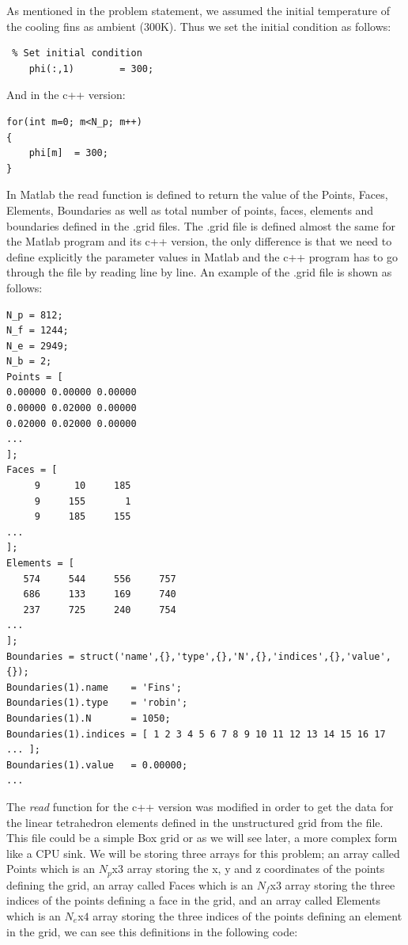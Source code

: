 \documentclass[12pt]{article}
\begin{document}
As mentioned in the problem statement, we assumed the initial temperature of the cooling fins as ambient (300K). Thus we set the initial condition as follows:

\begin{lstlisting}
 % Set initial condition
    phi(:,1)        = 300;
\end{lstlisting}

And in the c++ version:

\begin{lstlisting}[style=MyC++Style]
for(int m=0; m<N_p; m++)
{
	phi[m]	= 300;
}
\end{lstlisting}

In Matlab the read function is defined to return the value of the Points, Faces, Elements, Boundaries as well as total number of points, faces, elements and boundaries defined in the .grid files.
The .grid file is defined almost the same for the Matlab program and its c++ version, the only difference is that we need to define explicitly the parameter values in Matlab and the c++ 
program has to go through the file by reading line by line. An example of the .grid file is shown as follows:

\begin{lstlisting}
N_p = 812;
N_f = 1244;
N_e = 2949;
N_b = 2;
Points = [
0.00000	0.00000	0.00000
0.00000	0.02000	0.00000
0.02000	0.02000	0.00000
...
];
Faces = [
     9	    10	   185
     9	   155	     1
     9	   185	   155
...
];
Elements = [
   574	   544	   556	   757
   686	   133	   169	   740
   237	   725	   240	   754
...
];
Boundaries = struct('name',{},'type',{},'N',{},'indices',{},'value',{});
Boundaries(1).name    = 'Fins';
Boundaries(1).type    = 'robin';
Boundaries(1).N       = 1050;
Boundaries(1).indices = [ 1 2 3 4 5 6 7 8 9 10 11 12 13 14 15 16 17 ... ];
Boundaries(1).value   = 0.00000;
...
\end{lstlisting}

The \textit{read} function for the c++ version was modified in order to get the data for the linear tetrahedron elements defined in the unstructured grid from the file. This file could be a simple Box grid or as we will see later, a more complex form like a CPU sink. We will be storing three arrays for this problem; an array called Points which is an $N_p$x$3$ array storing the x, y and z coordinates of the points defining the grid, an array called Faces which is an $N_f$x$3$ array storing the three indices of the points defining a face in the grid, and an array called Elements which is an $N_e$x$4$ array storing the three indices of the points defining an element in the grid, we can see this definitions in the following code:
\end{document}
